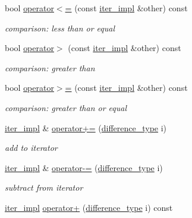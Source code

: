 \begin{DoxyCompactItemize}
bool \hyperlink{classnlohmann_1_1detail_1_1iter__impl_aa90b4d1da290b5073778e295dc2985f3}{operator$<$=} (const \hyperlink{classnlohmann_1_1detail_1_1iter__impl}{iter\+\_\+impl} \&other) const 
\begin{DoxyCompactList}\small\item\em comparison\+: less than or equal \end{DoxyCompactList}\item 
bool \hyperlink{classnlohmann_1_1detail_1_1iter__impl_afe8894bea0a0b616d9d5975ca04e8b39}{operator$>$} (const \hyperlink{classnlohmann_1_1detail_1_1iter__impl}{iter\+\_\+impl} \&other) const 
\begin{DoxyCompactList}\small\item\em comparison\+: greater than \end{DoxyCompactList}\item 
bool \hyperlink{classnlohmann_1_1detail_1_1iter__impl_ae87ea99999c169722b388c69871295e3}{operator$>$=} (const \hyperlink{classnlohmann_1_1detail_1_1iter__impl}{iter\+\_\+impl} \&other) const 
\begin{DoxyCompactList}\small\item\em comparison\+: greater than or equal \end{DoxyCompactList}\item 
\hyperlink{classnlohmann_1_1detail_1_1iter__impl}{iter\+\_\+impl} \& \hyperlink{classnlohmann_1_1detail_1_1iter__impl_a3eef94f9d167046e7f773aeb6b78090c}{operator+=} (\hyperlink{classnlohmann_1_1detail_1_1iter__impl_a2f7ea9f7022850809c60fc3263775840}{difference\+\_\+type} i)
\begin{DoxyCompactList}\small\item\em add to iterator \end{DoxyCompactList}\item 
\hyperlink{classnlohmann_1_1detail_1_1iter__impl}{iter\+\_\+impl} \& \hyperlink{classnlohmann_1_1detail_1_1iter__impl_abcc9d51bc52f2e8483bbe4018f05e978}{operator-\/=} (\hyperlink{classnlohmann_1_1detail_1_1iter__impl_a2f7ea9f7022850809c60fc3263775840}{difference\+\_\+type} i)
\begin{DoxyCompactList}\small\item\em subtract from iterator \end{DoxyCompactList}\item 
\hyperlink{classnlohmann_1_1detail_1_1iter__impl}{iter\+\_\+impl} \hyperlink{classnlohmann_1_1detail_1_1iter__impl_afc5629527a820583cd009c411e30ac64}{operator+} (\hyperlink{classnlohmann_1_1detail_1_1iter__impl_a2f7ea9f7022850809c60fc3263775840}{difference\+\_\+type} i) const 

\end{DoxyCompactItemize}
